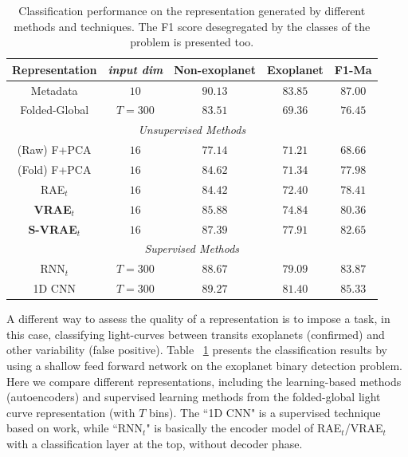 \begin{table}[!t]
\caption{Classification performance on the representation generated by different methods and techniques. The F1 score desegregated by the classes of the problem is presented too.}
\label{tab:class_results}
\centering
\begin{tabular}{c|c|cc|c} \hline %
\textbf{Representation} & \textit{input dim} & \textbf{Non-exoplanet} & \textbf{Exoplanet} & \textbf{F1-Ma} \\ \hline
Metadata   & $10$  & $90.13$ & $83.85$  & $87.00$   \\ %
Folded-Global & $T=300$ & $83.51$  & $69.36$  & $76.45$ \\ \hline
\multicolumn{5}{c}{\textit{Unsupervised Methods}} \\ \hline
(Raw) F+PCA    & $16$ & $77.14$  & $71.21$ & $68.66$ \\ %
(Fold) F+PCA  & $16$ & $84.62$  & $71.34$ & $77.98$ \\
RAE$_t$  & $16$  & $84.42$ & $72.40$  & $78.41$    \\ %
\textbf{VRAE$_t$}   & $16$  & $85.88$ & $74.84$  & $80.36$   \\ %
\textbf{S-VRAE$_t$} & $16$  & $87.39$ & $77.91$  & $82.65$     \\ \hline
\multicolumn{5}{c}{\textit{Supervised Methods}} \\ \hline %
RNN$_t$ & $T=300$  & $88.67$ & $79.09 $ & $83.87$   \\ %
1D CNN  & $T=300$ & $89.27$  & $81.40$  & $85.33$  \\  %
\hline
\end{tabular}
\end{table}
A different way to assess the quality of a representation is to impose a task, in this case, classifying light-curves between transits exoplanets (confirmed) and other variability (false positive).
Table ~\ref{tab:class_results} presents the classification results by using a shallow feed forward network on the exoplanet binary detection problem. Here we compare different representations, including the learning-based methods (autoencoders) and supervised learning methods from the folded-global light curve representation (with $T$ bins). The ``1D CNN" is a supervised technique based on \citep{shallue2018identifying} work, while ``RNN$_t$" is basically the encoder model of RAE$_t$/VRAE$_t$ with a classification layer at the top, without decoder phase.


